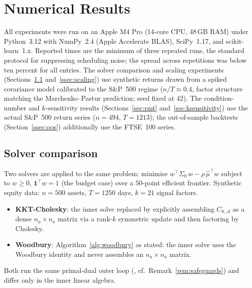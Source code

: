 \section{Numerical Results}\label{sec:results}

All experiments were run on an Apple M4 Pro (14-core CPU, 48\,GB RAM) under
Python~3.12 with NumPy~2.4 (Apple Accelerate BLAS), SciPy~1.17, and
scikit-learn~1.x. Reported times are the minimum of three repeated runs, the
standard protocol for suppressing scheduling noise; the spread across
repetitions was below ten percent for all entries.
The solver comparison and scaling experiments (Sections~\ref{ssec:solvers}
and~\ref{ssec:scaling}) use synthetic returns drawn from a spiked covariance
model calibrated to the S\&P~500 regime ($n/T \approx 0.4$, factor structure
matching the Marchenko--Pastur prediction; seed fixed at $42$). The
condition-number and $k$-sensitivity results
(Sections~\ref{sec:rmt} and~\ref{sec:ksensitivity}) use the
actual S\&P~500 return series ($n=494$, $T=1213$); the out-of-sample backtests
(Section~\ref{ssec:oos}) additionally use the FTSE~100 series.

\subsection{Solver comparison}\label{ssec:solvers}

Two solvers are applied to the same problem: minimise
$w^\top \Sigma_0\, w - \rho\,\hat\mu^\top w$
subject to $w \geq 0$, $\mathbf{1}^\top w = 1$ (the budget case) over a $50$-point efficient frontier.
Synthetic equity data: $n = 500$ assets, $T = 1250$ days, $k = 21$ signal factors.

\begin{itemize}
  \item \textbf{KKT-Cholesky}: the inner solve replaced by explicitly assembling
        $C_{0,\mathcal{A}}$ as a dense $n_a \times n_a$ matrix via a rank-$k$
        symmetric update and then factoring by Cholesky.
  \item \textbf{Woodbury}: Algorithm~\ref{alg:woodbury} as stated: the inner
        solve uses the Woodbury identity and never assembles an $n_a \times n_a$
        matrix.
\end{itemize}
Both run the same primal-dual outer loop
(\cite[Algorithm~1]{schmelzer2026nncg}, cf.\ Remark~\ref{rem:safeguards}) and
differ only in the inner linear algebra.

